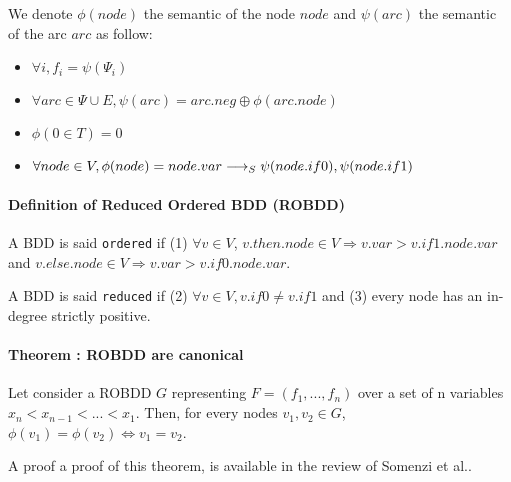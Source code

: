 \documentclass[a4paper,10pt]{article}
\begin{document}

We denote $\phi(node)$ the semantic of the node $node$ and $\psi(arc)$ the semantic of the arc $arc$ as follow:\begin{itemize}
\item $\forall i, f_i = \psi(\Psi_i)$
\item $\forall arc \in \Psi \cup E, \psi(arc) = arc.neg \oplus \phi(arc.node)$
\item $\phi(0 \in T) = 0$
\item $\forall node \in V, \phi(node) = node.var \longrightarrow_S \psi(node.if0), \psi(node.if1)$
\end{itemize}

\paragraph{Definition of Reduced Ordered BDD (ROBDD)\\}
A BDD is said \texttt{ordered} if (1) $\forall v\in V$, $v.then.node \in V \Rightarrow v.var > v.if1.node.var$ and $v.else.node \in V \Rightarrow v.var > v.if0.node.var$.

A BDD is said \texttt{reduced} if (2) $\forall v\in V, v.if0 \neq v.if1$ and (3) every node has an in-degree strictly positive.

\paragraph{Theorem : ROBDD are canonical\\}

Let consider a ROBDD $G$ representing $F=(f_1, ..., f_n)$ over a set of n variables $x_n < x_{n-1} < ... < x_1$. Then, for every nodes $v_1, v_2 \in G$, $\phi(v_1) = \phi(v_2) \Leftrightarrow v_1 = v_2$.

A proof a proof of this theorem, is available in the review of Somenzi et al.\cite{Somenzi1999}.
\end{document}
